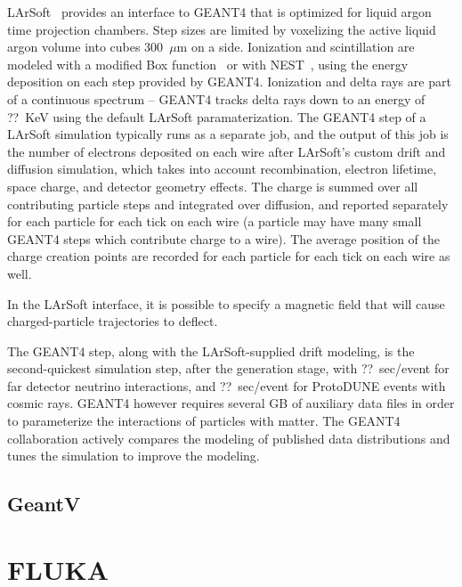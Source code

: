 LArSoft~\cite{larsoft} provides an interface to GEANT4 that is optimized for liquid argon time projection
chambers.  Step sizes are limited by voxelizing the active liquid argon volume into cubes 300~$\mu$m on a side.
Ionization and scintillation are modeled with a modified Box function~\cite{box} or with NEST~\cite{nest}, using
the energy deposition on each step provided by GEANT4.  Ionization and delta rays are part of a continuous
spectrum -- GEANT4 tracks delta rays down to an energy of ??~KeV using the default LArSoft paramaterization.
The GEANT4 step of a LArSoft simulation typically runs as a separate job, and the output of this job is the
number of electrons deposited on each wire after LArSoft's custom drift and diffusion simulation, which
takes into account recombination, electron lifetime, space charge, and detector geometry effects.  The charge
is summed over all contributing particle steps and integrated over diffusion, and reported separately for
each particle for each tick on each wire (a particle may have many small GEANT4 steps which contribute
charge to a wire).  The average position of the charge creation points are recorded for each particle for each
tick on each wire as well.  

In the LArSoft interface,  it is possible to specify a magnetic field that will cause charged-particle
trajectories to deflect.

The GEANT4 step, along with the LArSoft-supplied drift modeling, is the second-quickest simulation step,
after the generation stage, with ??~sec/event for far detector neutrino interactions, and ??~sec/event for
ProtoDUNE events with cosmic rays.  GEANT4 however requires several GB of auxiliary data files in order
to parameterize the interactions of particles with matter.  The GEANT4 collaboration actively compares
the modeling of published data distributions and tunes the simulation to improve the modeling.

\subsection{GeantV}

\section{FLUKA}

